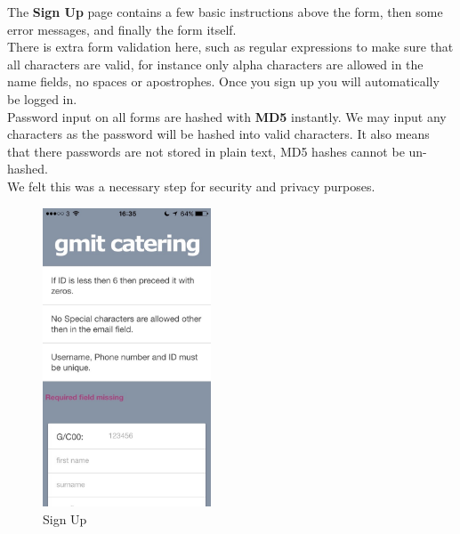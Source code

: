 \begin{minipage}{0.55\textwidth}
The \textbf{Sign Up} page contains a few basic instructions above the form, then some error messages, and finally the form itself.
\\

There is extra form validation here, such as regular expressions to make sure that all characters are valid, for instance only alpha characters are allowed in the name fields, no spaces or apostrophes. 
Once you sign up you will automatically be logged in.
\\

Password input on all forms are hashed with \textbf{MD5} instantly.
We may input any characters as the password will be hashed into valid characters.
It also means that there passwords are not stored in plain text, MD5 hashes cannot be un-hashed.
\\

We felt this was a necessary step for security and privacy purposes.
\end{minipage}
\begin{minipage}{5cm}
	\begin{figure}[H]
		\includegraphics[width=5cm]{img/mobile-app/screen-shots/IMG_2906.jpg}
		\caption{Sign Up}
	\end{figure}
\end{minipage} \hfill

